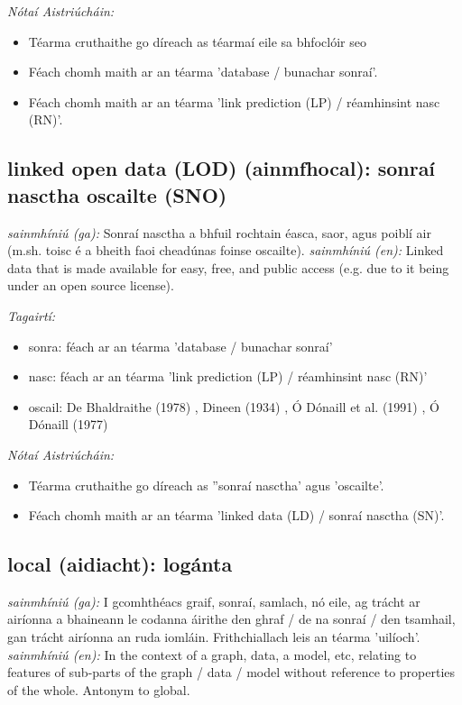 \documentclass{article}
\begin{document}
 \noindent \textit{Nótaí Aistriúcháin:}
\begin{itemize}
	\item Téarma cruthaithe go díreach as téarmaí eile sa bhfoclóir seo
	\item Féach chomh maith ar an téarma 'database / bunachar sonraí'.
	\item Féach chomh maith ar an téarma 'link prediction (LP) / réamhinsint nasc (RN)'.
\end{itemize}


\subsection*{linked open data (LOD) (ainmfhocal): sonraí nasctha oscailte (SNO)} 
 \noindent \textit{sainmhíniú (ga):} Sonraí nasctha a bhfuil rochtain éasca, saor, agus poiblí air (m.sh. toisc é a bheith faoi cheadúnas foinse oscailte).
\newline\newline
 \noindent \textit{sainmhíniú (en):} Linked data that is made available for easy, free, and public access (e.g. due to it being under an open source license).
\newline

 \noindent \textit{Tagairtí:}
\begin{itemize}
	\item sonra: féach ar an téarma 'database / bunachar sonraí'
	\item nasc: féach ar an téarma 'link prediction (LP) / réamhinsint nasc (RN)'
	\item oscail: De Bhaldraithe (1978) \cite{de-bhaldraithe}, Dineen (1934) \cite{dineen}, Ó Dónaill et al. (1991) \cite{focloir-beag}, Ó Dónaill (1977) \cite{odonaill}
\end{itemize}

 \noindent \textit{Nótaí Aistriúcháin:}
\begin{itemize}
	\item Téarma cruthaithe go díreach as ''sonraí nasctha' agus 'oscailte'.
	\item Féach chomh maith ar an téarma 'linked data (LD) / sonraí nasctha (SN)'.
\end{itemize}


\subsection*{local (aidiacht): logánta} 
 \noindent \textit{sainmhíniú (ga):} I gcomhthéacs graif, sonraí, samlach, nó eile, ag trácht ar airíonna a bhaineann le codanna áirithe den ghraf / de na sonraí / den tsamhail, gan trácht airíonna an ruda iomláin. Frithchiallach leis an téarma 'uilíoch'.
\newline\newline
 \noindent \textit{sainmhíniú (en):} In the context of a graph, data, a model, etc, relating to features of sub-parts of the graph / data / model without reference to properties of the whole. Antonym to global.
\newline
\end{document}

